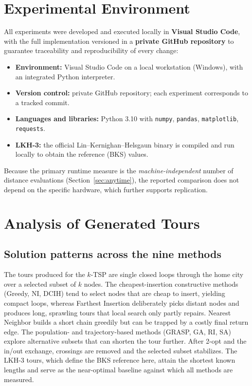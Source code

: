 \documentclass[conference]{IEEEtran}
\begin{document}
\section{Experimental Environment}
All experiments were developed and executed locally in \textbf{Visual Studio Code}, with the full implementation versioned in a \textbf{private GitHub repository} to guarantee traceability and reproducibility of every change:
\begin{itemize}
    \item \textbf{Environment:} Visual Studio Code on a local workstation (Windows), with an integrated Python interpreter.
    \item \textbf{Version control:} private GitHub repository; each experiment corresponds to a tracked commit.
    \item \textbf{Languages and libraries:} Python 3.10 with \texttt{numpy}, \texttt{pandas}, \texttt{matplotlib}, \texttt{requests}.
    \item \textbf{LKH-3:} the official Lin--Kernighan--Helsgaun binary is compiled and run locally to obtain the reference (BKS) values.
\end{itemize}
Because the primary runtime measure is the \emph{machine-independent} number of distance evaluations (Section~\ref{sec:anytime}), the reported comparison does not depend on the specific hardware, which further supports replication.

\section{Analysis of Generated Tours}
\subsection*{Solution patterns across the nine methods}

The tours produced for the $k$-TSP are single closed loops through the home city over a selected subset of $k$ nodes. The cheapest-insertion constructive methods (Greedy, NI, DCIH) tend to select nodes that are cheap to insert, yielding compact loops, whereas Farthest Insertion deliberately picks distant nodes and produces long, sprawling tours that local search only partly repairs. Nearest Neighbor builds a short chain greedily but can be trapped by a costly final return edge. The population- and trajectory-based methods (GRASP, GA, RI, SA) explore alternative subsets that can shorten the tour further. After 2-opt and the in/out exchange, crossings are removed and the selected subset stabilizes. The LKH-3 tours, which define the BKS reference here, attain the shortest known lengths and serve as the near-optimal baseline against which all methods are measured.
\end{document}
